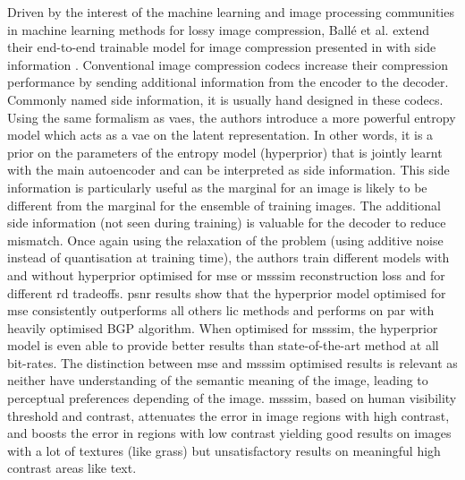 Driven by the interest of the machine learning and image processing communities in machine learning methods for lossy image compression, Ballé et al. extend their end-to-end trainable model for image compression presented in \cite{ballé2017endtoendoptimizedimagecompression} with side information \cite{ballé2018variationalimagecompressionscale}. Conventional image compression codecs increase their compression performance by sending additional information from the encoder to the decoder. Commonly named side information, it is usually hand designed in these codecs. Using the same formalism as \acrshort{vae}s, the authors introduce a more powerful entropy model which acts as a \acrshort{vae} on the latent representation. In other words, it is a prior on the parameters of the entropy model (hyperprior) that is jointly learnt with the main autoencoder and can be interpreted as side information. This side information is particularly useful as the marginal for an image is likely to be different from the marginal for the ensemble of training images. The additional side information (not seen during training) is valuable for the decoder to reduce mismatch. Once again using the relaxation of the problem (using additive noise instead of quantisation at training time), the authors train different models with and without hyperprior optimised for \acrshort{mse} or \acrshort{msssim} reconstruction loss and for different \acrshort{rd} tradeoffs. \acrshort{psnr} results show that the hyperprior model optimised for \acrshort{mse} consistently outperforms all others \acrshort{lic} methods and performs on par with heavily optimised BGP algorithm. When optimised for \acrshort{msssim}, the hyperprior model is even able to provide better results than state-of-the-art method at all bit-rates. The distinction between \acrshort{mse} and \acrshort{msssim} optimised results is relevant as neither have understanding of the semantic meaning of the image, leading to perceptual preferences depending of the image. \acrshort{msssim}, based on human visibility threshold and contrast, attenuates the error in image regions with high contrast, and boosts the error in regions with low contrast yielding good results on images with a lot of textures (like grass) but unsatisfactory results on meaningful high contrast areas like text.

